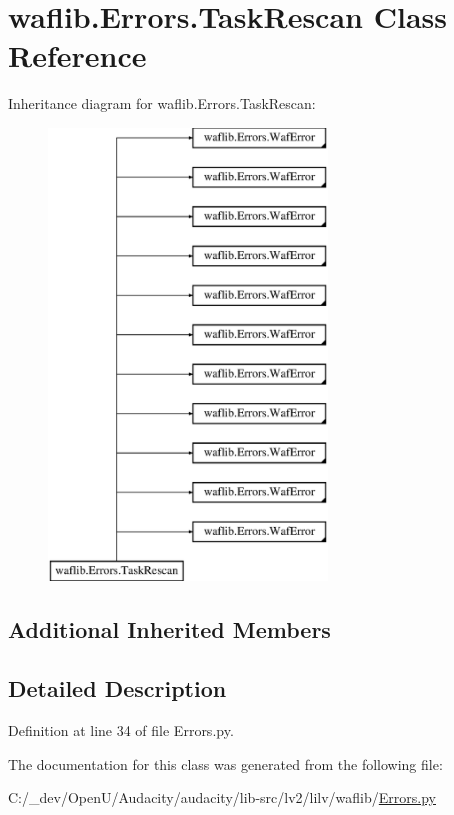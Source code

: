 \hypertarget{classwaflib_1_1_errors_1_1_task_rescan}{}\section{waflib.\+Errors.\+Task\+Rescan Class Reference}
\label{classwaflib_1_1_errors_1_1_task_rescan}
Inheritance diagram for waflib.\+Errors.\+Task\+Rescan\+:\begin{figure}[H]
\begin{center}
\leavevmode
\includegraphics[height=12.000000cm]{classwaflib_1_1_errors_1_1_task_rescan}
\end{center}
\end{figure}
\subsection*{Additional Inherited Members}


\subsection{Detailed Description}


Definition at line 34 of file Errors.\+py.



The documentation for this class was generated from the following file\+:\begin{DoxyCompactItemize}
\item 
C\+:/\+\_\+dev/\+Open\+U/\+Audacity/audacity/lib-\/src/lv2/lilv/waflib/\hyperlink{lilv_2waflib_2_errors_8py}{Errors.\+py}\end{DoxyCompactItemize}
